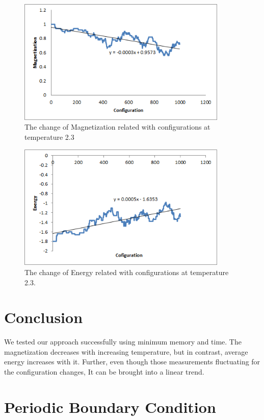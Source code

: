 \documentclass[]{article}
\begin{document}
\begin{figure}[H]
  \centering
  \includegraphics[width=10cm,height=6cm]{figures/Config}
  \caption{\label{fig:Config} The change of Magnetization related with configurations at temperature 2.3}
\end{figure}
\begin{figure}[H]
  \centering
  \includegraphics[width=10cm,height=6cm]{figures/Config_E}
  \caption{\label{fig:Config_E} The change of Energy related with configurations at temperature 2.3.}
\end{figure}

\section{Conclusion}
We tested our approach successfully using minimum memory and time.
The magnetization decreases with increasing temperature, but in contrast, average energy increases with it. Further, even though those measurements fluctuating for the configuration changes, It can be brought into a linear trend.
\newpage
\appendix
\section{Periodic Boundary Condition}
\end{document}

